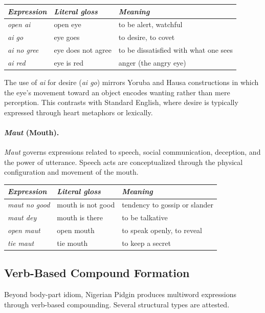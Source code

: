 \documentclass[12pt]{article}
\begin{document}
\begin{center}
\begin{tabular}{lll}
\textit{Expression} & \textit{Literal gloss} & \textit{Meaning} \\
\hline
\textit{open ai} & open eye & to be alert, watchful \\
\textit{ai go} & eye goes & to desire, to covet \\
\textit{ai no gree} & eye does not agree & to be dissatisfied with what one sees \\
\textit{ai red} & eye is red & anger (the angry eye) \\
\end{tabular}
\end{center}

The use of \textit{ai} for desire (\textit{ai go}) mirrors Yoruba and Hausa constructions in which the eye's movement toward an object encodes wanting rather than mere perception. This contrasts with Standard English, where desire is typically expressed through heart metaphors or lexically.

\paragraph{\textit{Maut} (Mouth).}
\textit{Maut} governs expressions related to speech, social communication, deception, and the power of utterance. Speech acts are conceptualized through the physical configuration and movement of the mouth.

\begin{center}
\begin{tabular}{lll}
\textit{Expression} & \textit{Literal gloss} & \textit{Meaning} \\
\hline
\textit{maut no good} & mouth is not good & tendency to gossip or slander \\
\textit{maut dey} & mouth is there & to be talkative \\
\textit{open maut} & open mouth & to speak openly, to reveal \\
\textit{tie maut} & tie mouth & to keep a secret \\
\end{tabular}
\end{center}

\subsection{Verb-Based Compound Formation}

Beyond body-part idiom, Nigerian Pidgin produces multiword expressions through verb-based compounding. Several structural types are attested.
\end{document}
